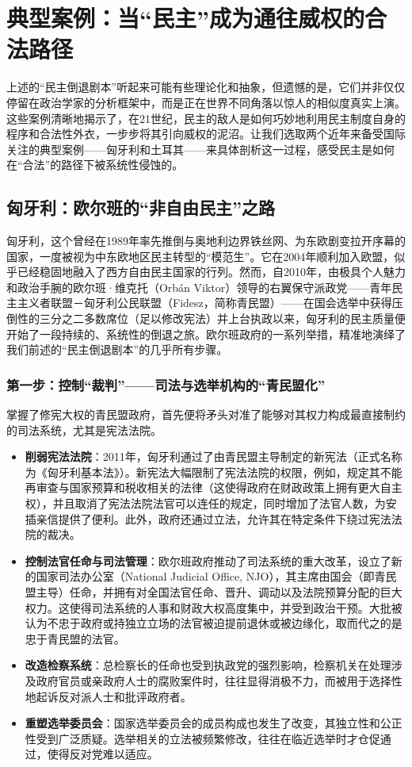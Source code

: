 \documentclass[UTF8, 10pt]{ctexbook}
\begin{document}
\section{典型案例：当“民主”成为通往威权的合法路径}
\lettrine[lines=2]{上}{述}的“民主倒退剧本”听起来可能有些理论化和抽象，但遗憾的是，它们并非仅仅停留在政治学家的分析框架中，而是正在世界不同角落以惊人的相似度真实上演。这些案例清晰地揭示了，在21世纪，民主的敌人是如何巧妙地利用民主制度自身的程序和合法性外衣，一步步将其引向威权的泥沼。让我们选取两个近年来备受国际关注的典型案例——匈牙利和土耳其——来具体剖析这一过程，感受民主是如何在“合法”的路径下被系统性侵蚀的。

\subsection{匈牙利：欧尔班的“非自由民主”之路}
匈牙利，这个曾经在1989年率先推倒与奥地利边界铁丝网、为东欧剧变拉开序幕的国家，一度被视为中东欧地区民主转型的“模范生”。它在2004年顺利加入欧盟，似乎已经稳固地融入了西方自由民主国家的行列。然而，自2010年，由极具个人魅力和政治手腕的欧尔班·维克托（Orbán Viktor）领导的右翼保守派政党——青年民主主义者联盟－匈牙利公民联盟（Fidesz，简称青民盟）——在国会选举中获得压倒性的三分之二多数席位（足以修改宪法）并上台执政以来，匈牙利的民主质量便开始了一段持续的、系统性的倒退之旅。欧尔班政府的一系列举措，精准地演绎了我们前述的“民主倒退剧本”的几乎所有步骤。

\subsubsection{第一步：控制“裁判”——司法与选举机构的“青民盟化”}
掌握了修宪大权的青民盟政府，首先便将矛头对准了能够对其权力构成最直接制约的司法系统，尤其是宪法法院。
\begin{itemize}
    \item \textbf{削弱宪法法院}：2011年，匈牙利通过了由青民盟主导制定的新宪法（正式名称为《匈牙利基本法》）。新宪法大幅限制了宪法法院的权限，例如，规定其不能再审查与国家预算和税收相关的法律（这使得政府在财政政策上拥有更大自主权），并且取消了宪法法院法官可以连任的规定，同时增加了法官人数，为安插亲信提供了便利。此外，政府还通过立法，允许其在特定条件下绕过宪法法院的裁决。
    \item \textbf{控制法官任命与司法管理}：欧尔班政府推动了司法系统的重大改革，设立了新的国家司法办公室（National Judicial Office, NJO），其主席由国会（即青民盟主导）任命，并拥有对全国法官任命、晋升、调动以及法院预算分配的巨大权力。这使得司法系统的人事和财政大权高度集中，并受到政治干预。大批被认为不忠于政府或持独立立场的法官被迫提前退休或被边缘化，取而代之的是忠于青民盟的法官。
    \item \textbf{改造检察系统}：总检察长的任命也受到执政党的强烈影响，检察机关在处理涉及政府官员或亲政府人士的腐败案件时，往往显得消极不力，而被用于选择性地起诉反对派人士和批评政府者。
    \item \textbf{重塑选举委员会}：国家选举委员会的成员构成也发生了改变，其独立性和公正性受到广泛质疑。选举相关的立法被频繁修改，往往在临近选举时才仓促通过，使得反对党难以适应。
\end{itemize}
\end{document}
